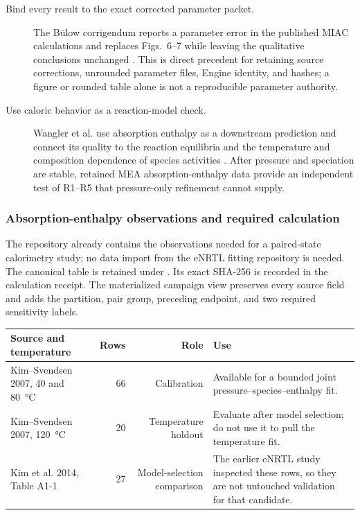 \documentclass[10pt,oneside]{scrartcl}
\begin{document}
\begin{description}
\item[Bind every result to the exact corrected parameter packet.] The B\"ulow
corrigendum reports a parameter error in the published MIAC calculations and
replaces Figs.~6--7 while leaving the qualitative conclusions unchanged
\cite{Bulow2021b}. This is direct precedent for retaining source corrections,
unrounded parameter files, Engine identity, and hashes; a figure or rounded
table alone is not a reproducible parameter authority.

\item[Use caloric behavior as a reaction-model check.] Wangler et al. use
absorption enthalpy as a downstream prediction and connect its quality to the
reaction equilibria and the temperature and composition dependence of species
activities \cite[pp.~24--26]{Wangler2018}. After pressure and speciation are
stable, retained MEA absorption-enthalpy data provide an independent test of
R1--R5 that pressure-only refinement cannot supply.
\end{description}

\subsubsection{Absorption-enthalpy observations and required calculation}
\label{sec:calorimetry-plan}

The repository already contains the observations needed for a paired-state
calorimetry study; no data import from the eNRTL fitting repository is needed.
The canonical table  is retained
under . Its exact SHA-256 is
recorded in the calculation receipt.
The materialized campaign view preserves every source field and adds the
partition, pair group, preceding endpoint, and two required sensitivity labels.

\begin{center}
\small
\begin{tabularx}{\textwidth}{@{}lrrY@{}}
\toprule
Source and temperature & Rows & Role & Use \\
\midrule
Kim--Svendsen 2007, 40 and \SI{80}{\celsius} & 66 & Calibration & Available for a bounded joint pressure--species--enthalpy fit. \\
Kim--Svendsen 2007, \SI{120}{\celsius} & 20 & Temperature holdout & Evaluate after model selection; do not use it to pull the temperature fit. \\
Kim et al. 2014, Table A1-1 & 27 & Model-selection comparison & The earlier eNRTL study inspected these rows, so they are not untouched validation for that candidate. \\
\bottomrule
\end{tabularx}
\end{center}
\end{document}
